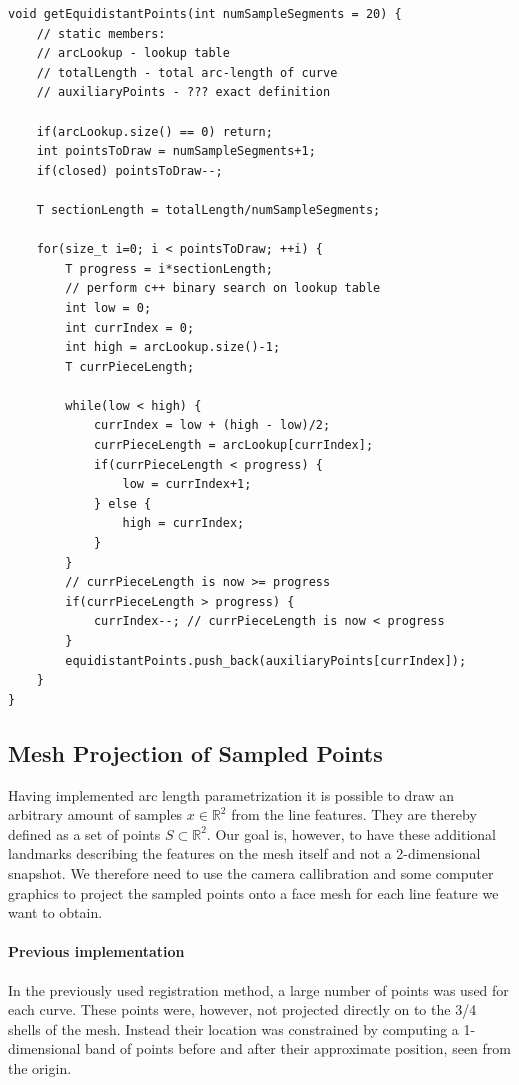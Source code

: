 \begin{lstlisting}[label=some-code, caption=Equidistant Sampling]
void getEquidistantPoints(int numSampleSegments = 20) {
    // static members: 
    // arcLookup - lookup table
    // totalLength - total arc-length of curve
    // auxiliaryPoints - ??? exact definition 

    if(arcLookup.size() == 0) return;
    int pointsToDraw = numSampleSegments+1; 
    if(closed) pointsToDraw--;

    T sectionLength = totalLength/numSampleSegments;

    for(size_t i=0; i < pointsToDraw; ++i) {
        T progress = i*sectionLength;
        // perform c++ binary search on lookup table
        int low = 0;
        int currIndex = 0;
        int high = arcLookup.size()-1;
        T currPieceLength; 

        while(low < high) {
            currIndex = low + (high - low)/2; 
            currPieceLength = arcLookup[currIndex];
            if(currPieceLength < progress) {
                low = currIndex+1;
            } else {
                high = currIndex;
            }
        }
        // currPieceLength is now >= progress
        if(currPieceLength > progress) {
            currIndex--; // currPieceLength is now < progress
        }
        equidistantPoints.push_back(auxiliaryPoints[currIndex]);   
    }
}
\end{lstlisting}

\subsection{Mesh Projection of Sampled Points}
Having implemented arc length parametrization it is possible to draw an arbitrary amount of samples $x \in \mathbb{R}^2$ from the line features. They are thereby defined as a set of points $S \subset \mathbb{R}^2$. Our goal is, however, to have these additional landmarks describing the features on the mesh itself and not a 2-dimensional snapshot.
We therefore need to use the camera callibration and some computer graphics to project the sampled points onto a face mesh for each line feature we want to obtain.

\paragraph{Previous implementation}
In the previously used registration method, a large number of points was used for each curve. These points were, however, not projected directly on to the 3/4 shells of the mesh. Instead their location was constrained by computing a 1-dimensional band of points before and after their approximate position, seen from the origin.

